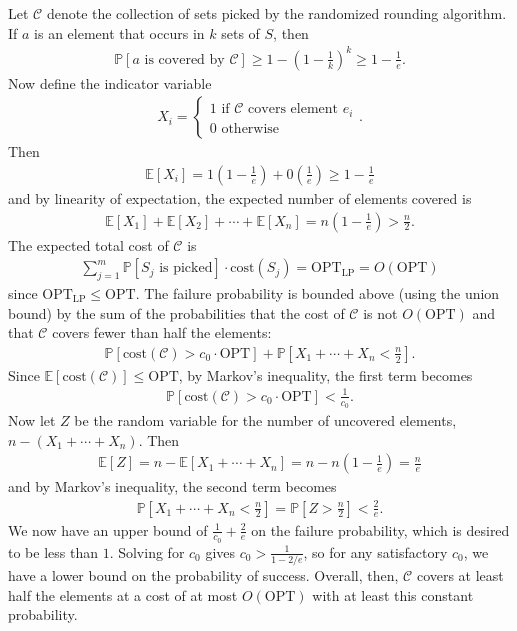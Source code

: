 \documentclass[a4paper,11pt]{article}
\begin{document}
Let $\mathcal{C}$ denote the collection of sets picked by the randomized rounding algorithm. If $a$ is an element that occurs in $k$ sets of $S$, then
\begin{align*}
    \mathbb{P}[a \text{ is covered by } \mathcal{C}] \geq 1 - \left( 1 - \frac{1}{k} \right)^k \geq 1 - \frac{1}{e}.
\end{align*}
Now define the indicator variable
\begin{align*}
    X_i = \begin{cases}
        1 \text{ if } \mathcal{C} \text{ covers element } e_i \\
        0 \text{ otherwise} 
    \end{cases}.
\end{align*}
Then
\begin{align*}
    \mathbb{E}[X_i] = 1 \left( 1 - \frac{1}{e} \right) + 0 \left( \frac{1}{e} \right) \geq 1 - \frac{1}{e}
\end{align*}
and by linearity of expectation, the expected number of elements covered is
\begin{align*}
    \mathbb{E}[X_1] + \mathbb{E}[X_2] + \cdots + \mathbb{E}[X_n] = n \left( 1 - \frac{1}{e} \right) > \frac{n}{2}.
\end{align*}
The expected total cost of $\mathcal{C}$ is
\begin{align*}
    \sum_{j = 1}^m \mathbb{P}[S_j \text{ is picked}] \cdot \text{cost}(S_j) = \text{OPT}_{\text{LP}} = O(\text{OPT})
\end{align*}
since $\text{OPT}_{\text{LP}} \leq \text{OPT}$. The failure probability is bounded above (using the union bound) by the sum of the probabilities that the cost of $\mathcal{C}$ is not $O(\text{OPT})$ and that $\mathcal{C}$ covers fewer than half the elements:
\begin{align*}
    \mathbb{P}[\text{cost}(\mathcal{C}) > c_0 \cdot \text{OPT}] + \mathbb{P}[X_1 + \cdots + X_n < \frac{n}{2}].
\end{align*}
Since $\mathbb{E}[\text{cost}(\mathcal{C})] \leq \text{OPT}$, by Markov's inequality, the first term becomes
\begin{align*}
    \mathbb{P}[\text{cost}(\mathcal{C}) > c_0 \cdot \text{OPT}] < \frac{1}{c_0}.
\end{align*}
Now let $Z$ be the random variable for the number of uncovered elements, $n - (X_1 + \cdots + X_n)$. Then
\begin{align*}
    \mathbb{E}[Z] = n - \mathbb{E}[X_1 + \cdots + X_n] = n - n \left( 1 - \frac{1}{e} \right) = \frac{n}{e}
\end{align*}
and by Markov's inequality, the second term becomes
\begin{align*}
    \mathbb{P}[X_1 + \cdots + X_n < \frac{n}{2}] = \mathbb{P}[Z > \frac{n}{2}] < \frac{2}{e}.
\end{align*}
We now have an upper bound of $\frac{1}{c_0} + \frac{2}{e}$ on the failure probability, which is desired to be less than $1$. Solving for $c_0$ gives $c_0 > \frac{1}{1 - 2/e}$, so for any satisfactory $c_0$, we have a lower bound on the probability of success. Overall, then, $\mathcal{C}$ covers at least half the elements at a cost of at most $O(\text{OPT})$ with at least this constant probability. \\
\end{document}
